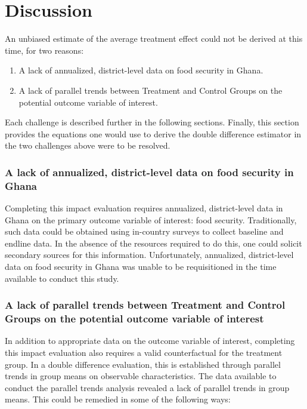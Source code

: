 \chapter{Discussion}

An unbiased estimate of the average treatment effect could not be derived at this time, for two reasons:

\begin{enumerate}
  \item A lack of annualized, district-level data on food security in Ghana.
  \item A lack of parallel trends between Treatment and Control Groups on the potential outcome variable of interest.
\end{enumerate}

Each challenge is described further in the following sections. Finally, this section provides the equations one would use to derive the double difference estimator in the two challenges above were to be resolved.

\subsection{A lack of annualized, district-level data on food security in Ghana}

Completing this impact evaluation requires annualized, district-level data in Ghana on the primary outcome variable of interest: food security. Traditionally, such data could be obtained using  in-country surveys to collect baseline and endline data. In the absence of the resources required to do this, one could solicit secondary sources for this information. Unfortunately, annualized, district-level data on food security in Ghana was unable to be requisitioned in the time available to conduct this study.

\subsection{A lack of parallel trends between Treatment and Control Groups on the potential outcome variable of interest}

In addition to appropriate data on the outcome variable of interest, completing this impact evaluation also requires a valid counterfactual for the treatment group. In a double difference evaluation, this is established through parallel trends in group means on observable characteristics. The data available to conduct the parallel trends analysis revealed a lack of parallel trends in group means. This could be remedied in some of the following ways:

